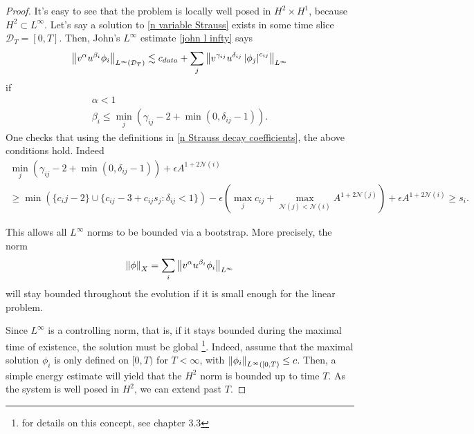 \documentclass[11pt, oneside]{amsart}
\begin{document}
\begin{proof}
		It's easy to see that the problem is locally well posed in $H^{2}\times H^{1}$, because $H^{2}\subset L^\infty$. Let's say a solution to \eqref{n variable Strauss} exists in some time slice $\mathcal{D}_T=[0,T]$. Then, John's $L^\infty$ estimate \cref{john l infty} says
		\begin{equation*}
			\begin{gathered}
				\left\lVert v^{\alpha}u^{\beta_i}\phi_i\right\rVert_{L^\infty(\mathcal{D}_T)}\lesssim c_{data}+\sum_j\left\lVert v^{\gamma_{ij}}u^{\delta_{ij}}\left\lvert \phi_j\right\rvert^{c_{ij}}\right\rVert_{L^\infty}
			\end{gathered}
		\end{equation*}
		if
		\begin{equation*}
			\begin{gathered}
				\alpha<1\\
				\beta_i\leq\min_j(\gamma_{ij}-2+\min(0,\delta_{ij}-1)).
			\end{gathered}
		\end{equation*}
		One checks that using the definitions in \eqref{n Strauss decay coefficients}, the above conditions hold. Indeed
		\begin{equation*}
			\begin{gathered}
				\min_j(\gamma_{ij}-2+\min(0,\delta_{ij}-1))+\epsilon A^{1+2\mathcal{N}(i)}\\
				\geq \min(\{c_ij-2\}\cup\{c_{ij}-3+c_{ij}s_j:\delta_{ij}<1\})-\epsilon(\max_j c_{ij}+\max_{\mathcal{N}(j)<\mathcal{N}(i)}A^{1+2\mathcal{N}(j)})+\epsilon A^{1+2\mathcal{N}(i)}\geq s_i.
			\end{gathered}
		\end{equation*}
		
		This allows all $L^\infty$ norms to be bounded via a bootstrap. More precisely, the norm
		\begin{equation*}
			\begin{gathered}
				\left\lVert \phi\right\rVert_X=\sum_i \left\lVert v^{\alpha}u^{\beta_i}\phi_i\right\rVert_{L^\infty}
			\end{gathered}
		\end{equation*}
		will stay bounded throughout the evolution if it is small enough for the linear problem.
		
		Since $L^\infty$ is a controlling norm, that is, if it stays bounded during the maximal time of existence, the solution must be global \footnote{for details on this concept, see \cite{tao_nonlinear_2006} chapter 3.3}. Indeed, assume that the maximal solution $\phi_i$ is only defined on $[0,T)$ for $T<\infty$, with $\left\lVert \phi_i\right\rVert_{L^\infty([0,T)}\leq c$. Then, a simple energy estimate will yield that the $H^2$ norm is bounded up to time $T$. As the system is well posed in $H^2$, we can extend past $T$.
	\end{proof}
	
\end{document}
